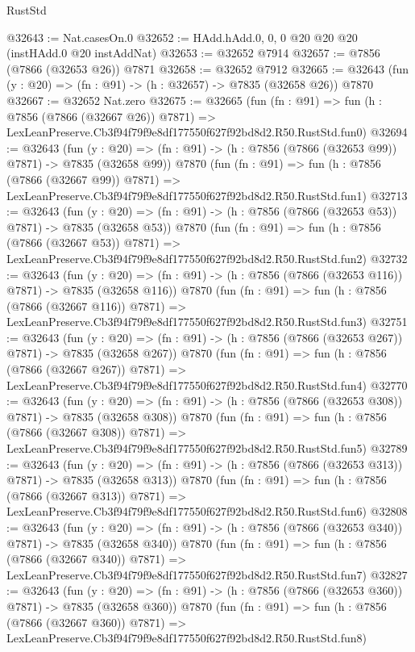 \begin{lexlean}{RustStd}
\begin{coremodule}
@32643 := Nat.casesOn.{0}
@32652 := HAdd.hAdd.{0, 0, 0} @20 @20 @20 (instHAdd.{0} @20 instAddNat)
@32653 := @32652 @7914
@32657 := @7856 (@7866 (@32653 @26)) @7871
@32658 := @32652 @7912
@32665 := @32643 (fun (y : @20) => (fn : @91) -> (h : @32657) -> @7835 (@32658 @26)) @7870
@32667 := @32652 Nat.zero
@32675 := @32665
    (fun (fn : @91) =>
    fun (h : @7856 (@7866 (@32667 @26)) @7871) =>
    LexLeanPreserve.Cb3f94f79f9e8df177550f627f92bd8d2.R50.RustStd.fun0)
@32694 := @32643
    (fun (y : @20) => (fn : @91) -> (h : @7856 (@7866 (@32653 @99)) @7871) -> @7835 (@32658 @99))
    @7870
    (fun (fn : @91) =>
    fun (h : @7856 (@7866 (@32667 @99)) @7871) =>
    LexLeanPreserve.Cb3f94f79f9e8df177550f627f92bd8d2.R50.RustStd.fun1)
@32713 := @32643
    (fun (y : @20) => (fn : @91) -> (h : @7856 (@7866 (@32653 @53)) @7871) -> @7835 (@32658 @53))
    @7870
    (fun (fn : @91) =>
    fun (h : @7856 (@7866 (@32667 @53)) @7871) =>
    LexLeanPreserve.Cb3f94f79f9e8df177550f627f92bd8d2.R50.RustStd.fun2)
@32732 := @32643
    (fun (y : @20) => (fn : @91) -> (h : @7856 (@7866 (@32653 @116)) @7871) -> @7835 (@32658 @116))
    @7870
    (fun (fn : @91) =>
    fun (h : @7856 (@7866 (@32667 @116)) @7871) =>
    LexLeanPreserve.Cb3f94f79f9e8df177550f627f92bd8d2.R50.RustStd.fun3)
@32751 := @32643
    (fun (y : @20) => (fn : @91) -> (h : @7856 (@7866 (@32653 @267)) @7871) -> @7835 (@32658 @267))
    @7870
    (fun (fn : @91) =>
    fun (h : @7856 (@7866 (@32667 @267)) @7871) =>
    LexLeanPreserve.Cb3f94f79f9e8df177550f627f92bd8d2.R50.RustStd.fun4)
@32770 := @32643
    (fun (y : @20) => (fn : @91) -> (h : @7856 (@7866 (@32653 @308)) @7871) -> @7835 (@32658 @308))
    @7870
    (fun (fn : @91) =>
    fun (h : @7856 (@7866 (@32667 @308)) @7871) =>
    LexLeanPreserve.Cb3f94f79f9e8df177550f627f92bd8d2.R50.RustStd.fun5)
@32789 := @32643
    (fun (y : @20) => (fn : @91) -> (h : @7856 (@7866 (@32653 @313)) @7871) -> @7835 (@32658 @313))
    @7870
    (fun (fn : @91) =>
    fun (h : @7856 (@7866 (@32667 @313)) @7871) =>
    LexLeanPreserve.Cb3f94f79f9e8df177550f627f92bd8d2.R50.RustStd.fun6)
@32808 := @32643
    (fun (y : @20) => (fn : @91) -> (h : @7856 (@7866 (@32653 @340)) @7871) -> @7835 (@32658 @340))
    @7870
    (fun (fn : @91) =>
    fun (h : @7856 (@7866 (@32667 @340)) @7871) =>
    LexLeanPreserve.Cb3f94f79f9e8df177550f627f92bd8d2.R50.RustStd.fun7)
@32827 := @32643
    (fun (y : @20) => (fn : @91) -> (h : @7856 (@7866 (@32653 @360)) @7871) -> @7835 (@32658 @360))
    @7870
    (fun (fn : @91) =>
    fun (h : @7856 (@7866 (@32667 @360)) @7871) =>
    LexLeanPreserve.Cb3f94f79f9e8df177550f627f92bd8d2.R50.RustStd.fun8)

\end{coremodule}
\end{lexlean}
